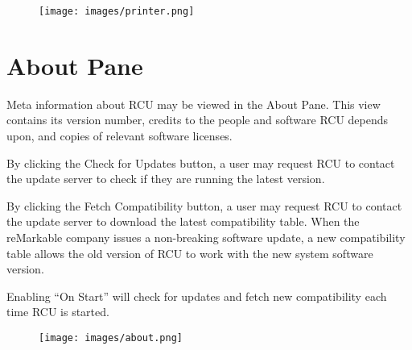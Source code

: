 \vfill
\begin{figure}[h]
  \centering
  \texttt{[image: images/printer.png]}
  \caption{}
  \label{fig:printerpane}
\end{figure}
\vfill


\newpage
\section{About Pane}
\label{sec:aboutpane}
Meta information about RCU may be viewed in the About Pane. This view contains its version number, credits to the people and software RCU depends upon, and copies of relevant software licenses.

By clicking the Check for Updates button, a user may request RCU to contact the update server to check if they are running the latest version.

By clicking the Fetch Compatibility button, a user may request RCU to contact the update server to download the latest compatibility table. When the reMarkable company issues a non-breaking software update, a new compatibility table allows the old version of RCU to work with the new system software version.

Enabling ``On Start'' will check for updates and fetch new compatibility each time RCU is started.

\vfill
\begin{figure}[h]
  \centering
  \texttt{[image: images/about.png]}
  \caption{}
  \label{fig:aboutpane}
\end{figure}
\vfill
